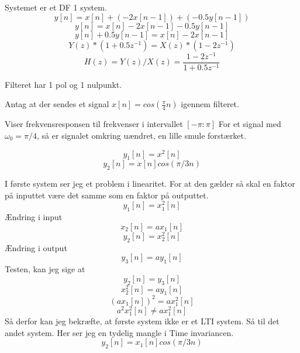\begin{rubrik}[Eksamenssæt2022]
\begin{eksamensOpgave}
    \end{eksamensOpgave}
    \begin{eksamensOpgave}
        \begin{UnderOpgave}
            Systemet er et DF 1 system. 
            \[y[n] = x[n] + (-2x[n - 1]) + (-0.5y[n - 1])\]
            \[y[n] = x[n] - 2x[n - 1] - 0.5y[n - 1]\]
            \[y[n] + 0.5y[n - 1]= x[n] - 2x[n - 1]\]
            \[Y(z) * (1 + 0.5z^{-1}) = X(z) * (1 - 2z^{-1})\]
            \[H(z) = Y(z)/X(z) = \frac{1 - 2z^{-1}}{1 + 0.5z^{-1}}\]            
        \end{UnderOpgave}
        \begin{UnderOpgave}
            Filteret har 1 pol og 1 nulpunkt.             
        \end{UnderOpgave}
        Antag at der sendes et signal $x[n] = cos(\frac{\pi}{4} n)$ igennem filteret. 
        \begin{UnderOpgave}
            Viser frekvensresponsen til frekvenser i intervallet $[-\pi: \pi]$
            For et signal med $\omega_0 = \pi/4$, så er signalet omkring uændret, en lille smule forstærket.
        \end{UnderOpgave}
    \end{eksamensOpgave}
    \begin{eksamensOpgave}
        \[y_1[n] = x^2[n]\]
        \[y_2[n] = x[n]cos(\pi/3 n)\]
        \begin{UnderOpgave}
            I første system ser jeg et problem i linearitet. 
            For at den gælder så skal en faktor på inputtet være det samme som en faktor på outputtet.
            \[y_1[n] = x_1^2[n]\]
            Ændring i input
            \[x_2[n] = ax_1[n]\] 
            \[y_2[n] = x_2^2[n]\]
            Ændring i output
            \[y_3[n] = ay_1[n]\]
            Testen, kan jeg sige at
            \[y_2[n] = y_3[n]\] 
            \[x_2^2[n] = ay_1[n]\] 
            \[(ax_1[n])^2 = ax_1^2[n]\] 
            \[a^2x_1^2[n] \neq ax_1^2[n]\] 
            Så derfor kan jeg bekræfte, at første system ikke er et LTI system.
            Så til det andet system.
            Her ser jeg en tydelig mangle i Time invariancen.
            \[y_2[n] = x_1[n]cos(\pi/3 n)\]

\end{UnderOpgave}
\end{eksamensOpgave}
\end{rubrik}
